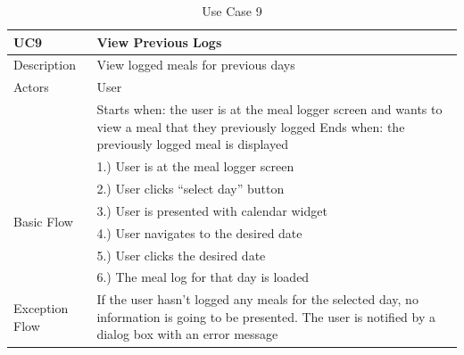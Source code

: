 \documentclass{article}
\begin{document}
\begin{appendicies}
\begin{table}[!htbp]
\centering
\hspace*{-0.5cm}
\begin{tabular}{||m{6cm}|m{6cm}||}
    \hline
    UC9 & View Previous Logs\\
    \hline
    Description & View logged meals for previous days\\
    \hline
    Actors & User\\
    \hline
    & Starts when:  the user is at the meal logger screen and wants to view a meal that they previously logged\newline
    Ends when: the previously logged meal is displayed\\
    \hline
    \multirow{6}{\hsize}{Basic Flow} 
                                    & 1.) User is at the meal logger screen\\
                                    & 2.) User clicks “select day” button\\
                                    & 3.) User is presented with calendar widget\\
                                    & 4.) User navigates to the desired date\\
                                    & 5.) User clicks the desired date\\
                                    & 6.) The meal log for that day is loaded\\
    \hline
    Exception Flow & If the user hasn’t logged any meals for the selected day, no information is going to be presented. The user is notified by a dialog box with an error message\\
\hline
\end{tabular}
\caption{Use Case 9}
\label{table:UC9}
\end{table}


\end{appendicies}
\end{document}
